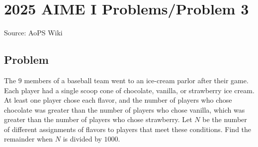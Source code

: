 \documentclass[12pt]{article}
\begin{document}
\section*{{2025 AIME I Problems/Problem 3}}
Source: AoPS Wiki

\subsection*{Problem}
The $9$ members of a baseball team went to an ice-cream parlor after their game. Each player had a single scoop cone of chocolate, vanilla, or strawberry ice cream. At least one player chose each flavor, and the number of players who chose chocolate was greater than the number of players who chose vanilla, which was greater than the number of players who chose strawberry. Let $N$ be the number of different assignments of flavors to players that meet these conditions. Find the remainder when $N$ is divided by $1000.$
\end{document}
